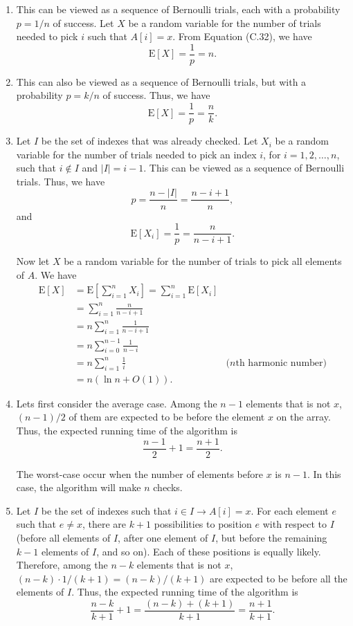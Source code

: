 \documentclass{report}
\makeatletter
\renewenvironment{framed}{%
 \def\FrameCommand##1{\hskip\@totalleftmargin
 \fboxsep=\FrameSep\fbox{##1}}%
 \MakeFramed {\advance\hsize-\width
   \@totalleftmargin\z@ \linewidth\hsize
   \@setminipage}}%
 {\par\unskip\endMakeFramed}
\makeatother
\begin{document}
\begin{enumerate}
\begin{framed}
\begin{enumerate}
\item This can be viewed as a sequence of Bernoulli trials, each with
a probability $p = 1/n$ of success. Let $X$ be a random variable for the number
of trials needed to pick $i$ such that $A[i] = x$. From Equation (C.32), we have
\[
  \text{E}[X] = \frac{1}{p} = n.
\]

\item This can also be viewed as a sequence of Bernoulli trials, but with
a probability $p = k/n$ of success. Thus, we have
\[
  \text{E}[X] = \frac{1}{p} = \frac{n}{k}.
\]

\item Let $I$ be the set of indexes that was already checked. Let $X_i$ be
a random variable for the number of trials needed to pick an index $i$, for
$i = 1, 2, \dots, n$, such that $i \notin I$ and $|I| = i - 1$. This can be
viewed as a sequence of Bernoulli trials. Thus, we have
\[
  p = \frac{n - |I|}{n} = \frac{n - i + 1}{n},
\]
and
\[
  \text{E}[X_i] = \frac{1}{p} = \frac{n}{n - i + 1}.
\]

Now let $X$ be a random variable for the number of trials to pick all elements
of $A$. We have
\begin{equation*}
\begin{aligned}
  \text{E}[X] &= \text{E}\left[\sum_{i = 1}^{n} X_i \right]
              = \sum_{i = 1}^{n} \text{E}[X_i]\\
              &= \sum_{i = 1}^{n} \frac{n}{n - i + 1}\\
              &= n \sum_{i = 1}^{n} \frac{1}{n - i + 1}\\
              &= n \sum_{i = 0}^{n - 1} \frac{1}{n - i}\\
              &= n \sum_{i = 1}^{n} \frac{1}{i} & \text{($n$th harmonic number)}\\
              &= n (\ln n + O(1)).
\end{aligned}
\end{equation*}

\item Lets first consider the average case. Among the $n - 1$ elements that is
not $x$, $(n - 1)/2$ of them are expected to be before the element $x$ on the
array. Thus, the expected running time of the algorithm is
\[
  \frac{n - 1}{2} + 1 = \frac{n + 1}{2}.
\]

The worst-case occur when the number of elements before $x$ is $n - 1$. In this
case, the algorithm will make $n$ checks.

\item Let $I$ be the set of indexes such that $i \in I \rightarrow A[i] = x$.
For each element $e$ such that $e \neq x$, there are $k + 1$ possibilities to
position $e$ with respect to $I$ (before all elements of $I$, after one
element of $I$, but before the remaining $k - 1$ elements of $I$, and so on).
Each of these positions is equally likely.  Therefore, among the $n - k$
elements that is not $x$, $(n - k) \cdot 1/(k + 1) = (n - k)/(k + 1)$ are
expected to be before all the elements of $I$. Thus, the expected running time
of the algorithm is
\[
  \frac{n - k}{k + 1} + 1 = \frac{(n - k) + (k + 1)}{k + 1} = \frac{n + 1}{k + 1}.
\]


\end{enumerate}
\end{framed}
\end{enumerate}
\end{document}
